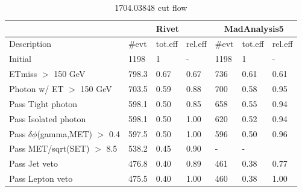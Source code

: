 \documentclass[11pt]{cernrep}
\begin{document}
\begin{table}[htbp]
\tiny
	\centering
		\begin{tabular}{ | l || l | l | l || l | l | l | }
\hline
                  &  \multicolumn{3}{c||}{\bf Rivet} & \multicolumn{3}{c||}{\bf MadAnalysis5}    \\ \hline

Description       & \#evt & tot.eff & rel.eff & \#evt & tot.eff & rel.eff    \\ \hline \hline

Initial                    &  	1198	& 1		  & -     & 1198	& 1	 &    -      \\ \hline
ETmiss $>$ 150 GeV           &   	798.3	& 0.67	& 0.67	& 736	& 0.61 &  0.61     \\ \hline
Photon w/ ET $>$ 150 GeV     &   	703.5	& 0.59	& 0.88	& 700	& 0.58 &  0.95     \\ \hline
Pass Tight photon          &   	598.1	& 0.50	& 0.85	& 658	& 0.55 & 	0.94     \\ \hline
Pass Isolated photon       &   	598.1	& 0.50	& 1.00	& 620	& 0.52 & 	0.94     \\ \hline
Pass $\delta\phi$(gamma,MET) $>$ 0.4 &   	597.5	& 0.50	& 1.00	& 596	& 0.50 & 	0.96     \\ \hline
Pass MET/sqrt(SET) $>$ 8.5   &   	538.2	& 0.45	& 0.90	& -	  &  -   &     	     \\ \hline
Pass Jet veto              &   	476.8	& 0.40	& 0.89	& 461	& 0.38 & 	0.77     \\ \hline
Pass Lepton veto           &   	475.5	& 0.40	& 1.00	& 460	& 0.38 & 	1.00     \\ \hline

		\end{tabular}
	\caption{1704.03848 cut flow}
	\label{tab:1704.03848}
\end{table}
\end{document}

